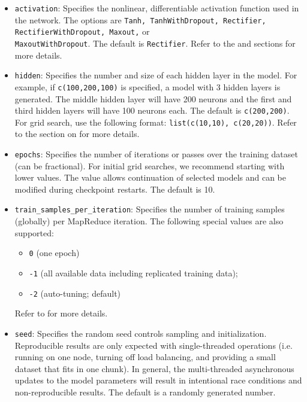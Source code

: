 {{\begin{itemize}
\item \texttt{activation}: Specifies the nonlinear, differentiable activation function used in the network. The options are \texttt{Tanh, TanhWithDropout, Rectifier, RectifierWithDropout, Maxout,} or \\\texttt{MaxoutWithDropout}. The default is \texttt{Rectifier}. Refer to the {\textbf{}} and {\textbf{}} sections for more details.

\item \texttt{hidden}: Specifies the number and size of each hidden layer in the model. For example, if \texttt{c(100,200,100)} is specified, a model with 3 hidden layers is generated. The middle hidden layer will have 200 neurons and the first and third hidden layers will have 100 neurons each. The default is \texttt{c(200,200)}. For grid search, use the following format: \texttt{list(c(10,10), c(20,20))}. Refer to the section on  {\textbf{}} for more details. 

\item \texttt{epochs}: Specifies the number of iterations or passes over the training dataset (can be fractional). For initial grid searches, we recommend starting with lower values. The value allows continuation of selected models and can be modified during checkpoint restarts. The default is 10.

\item \texttt{train\_samples\_per\_iteration}: Specifies the number of training samples (globally) per MapReduce iteration. The following special values are also supported: 
\begin{itemize}
\item \texttt{0} (one epoch)
\item \texttt{-1} (all available data including replicated training data);
\item \texttt{-2} (auto-tuning; default)
\end{itemize}
Refer to {\textbf{}} for more details.

\item \texttt{seed}: Specifies the random seed controls sampling and initialization. Reproducible results are only expected with single-threaded operations (i.e. running on one node, turning off load balancing, and providing a small dataset that fits in one chunk).  In general, the multi-threaded asynchronous updates to the model parameters will result in intentional race conditions and non-reproducible results.  The default is a randomly generated number.


\end{itemize}}}
